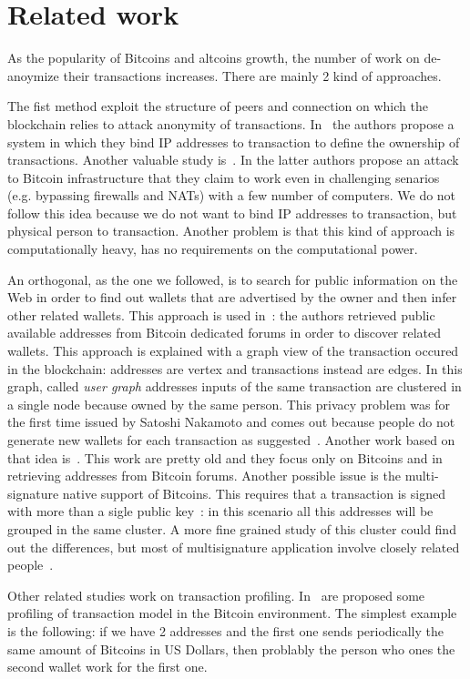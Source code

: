 \section{Related work}
As the popularity of Bitcoins and altcoins growth, the number of work on
de-anoymize their transactions increases. There are mainly 2 kind of approaches.

The fist method exploit the structure of peers and connection on which the
blockchain relies to attack anonymity of transactions. In~\cite{anonBitcoin}
the authors propose a system in which they bind IP addresses to transaction to
define the ownership of transactions. Another valuable study
is~\cite{deanonP2P}. In the latter authors propose an attack to Bitcoin
infrastructure that they claim to work even in challenging senarios (e.g.
bypassing firewalls and NATs) with a few number of computers. We do not follow
this idea because we do not want to bind IP addresses to transaction, but
physical person to transaction. Another problem is that this kind of approach is
computationally heavy, has no requirements on the computational power.

An orthogonal, as the one we followed, is to search for public information on
the Web in order to find out wallets that are advertised by the owner and then
infer other related wallets. This approach is used in~\cite{anonAnalysis}: the
authors retrieved public available addresses from Bitcoin dedicated forums in
order to discover related wallets. This approach is explained with a graph view
of the transaction occured in the blockchain: addresses are vertex and
transactions instead are edges. In this graph, called \textit{user graph}
addresses inputs of the same transaction are clustered in a single node because
owned by the same person. This privacy problem was for the first time issued by
Satoshi Nakamoto and comes out because people do not generate new wallets for
each transaction as suggested~\cite{satoshi}. Another work based on that idea
is~\cite{fistful}. This work are pretty old and they focus only on Bitcoins and
in retrieving addresses from Bitcoin forums. Another possible issue is the
multi-signature native support of Bitcoins. This requires that a transaction is
signed with more than a sigle public key~\cite{multisignature}: in this
scenario all this addresses will be grouped in the same cluster. A more fine
grained study of this cluster could find out the differences, but most of
multisignature application involve closely related
people~\cite{multisignaturebitcoinwiki}.

Other related studies work on transaction profiling. In~\cite{fullDiscl} are proposed some profiling of transaction model in the Bitcoin environment. The simplest example is the following: if we have 2 addresses and the first one sends periodically the same amount of Bitcoins in US Dollars, then problably the person who ones the second wallet work for the first one.